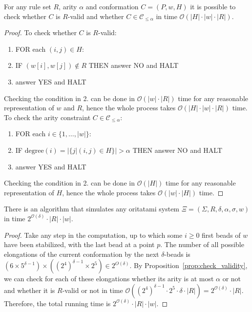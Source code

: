 \documentclass[runningheads]{llncs}
\begin{document}
\begin{proposition}\label{prop:check_validity}
	For any rule set $R$, arity $\alpha$ and conformation $C = (P,w,H)$ it is possible to check whether $C$ is $R$-valid and whether $C\in \mathcal{C}_{\leq \alpha}$ in time $\mathcal{O}(|H|\cdot|w|\cdot|R|)$.
\end{proposition}
\begin{proof}
	To check whether $C$ is $R$-valid:
	\begin{enumerate}
		\item FOR each $(i,j)\in H$:
		\item \hspace{1cm} IF $(w[i],w[j])\notin R$ THEN answer NO and HALT
		\item answer YES and HALT
	\end{enumerate}	
	Checking the condition in 2. can be done in $\mathcal{O}(|w|\cdot|R|)$ time for any reasonable representation of $w$ and $R$, hence the whole process takes $\mathcal{O}(|H|\cdot |w|\cdot|R|)$ time.	
	To check the arity constraint $C\in \mathcal{C}_{\leq \alpha}$: 
	\begin{enumerate}
		\item FOR each $i\in \{1,\dots,|w|\}$:
		\item \hspace{1cm} IF $\mathrm{degree}(i)=|\{j | (i,j)\in H \}|>\alpha$ THEN answer NO and HALT
		\item answer YES and HALT
	\end{enumerate}	
	Checking the condition in 2. can be done in $\mathcal{O}(|H|)$ time for any reasonable representation of $H$, hence the whole process takes $\mathcal{O}(|w|\cdot|H|)$ time.
\end{proof}
\begin{theorem}\label{thm:OS_to_2dTM}
	There is an algorithm that simulates any oritatami system $\Xi = (\Sigma, R, \delta, \alpha, \sigma, w)$ in time $2^{\mathcal{O}(\delta)}\cdot |R|\cdot|w|$. 
\end{theorem}
\begin{proof}
	Take any step in the computation, up to which some $i \ge 0$ first beads of $w$ have been stabilized, with the last bead at a point $p$. 
	The number of all possible elongations of the current conformation by the next $\delta$-beads is $(6 \times 5^{\delta-1}) \times ((2^4)^{\delta-1} \times 2^5) \in 2^{O(\delta)}$. 
	By Proposition~\ref{prop:check_validity}, we can check for each of these elongations whether its arity is at most $\alpha$ or not and whether it is $R$-valid or not in time $\mathcal{O}((2^4)^{\delta-1}\cdot2^5\cdot \delta\cdot|R|)=2^{\mathcal{O}(\delta)}\cdot|R|$.  Therefore, the total running time is $2^{\mathcal{O}(\delta)}\cdot |R|\cdot|w|$.
\end{proof}
\end{document}
